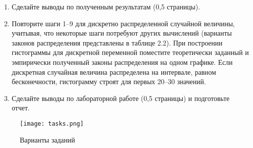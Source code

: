 \begin{enumerate}
    \item Сделайте выводы по полученным результатам (0,5 страницы).
    
    \item Повторите шаги 1–9 для дискретно распределенной случайной величины, учитывая, что некоторые шаги потребуют других вычислений (варианты законов распределения представлены в таблице 2.2). При построении гистограммы для дискретной переменной поместите теоретически заданный и эмпирически полученный законы распределения на одном графике. Если дискретная случайная величина распределена на интервале, равном бесконечности, гистограмму строят для первых 20–30 значений.
    
    \item Сделайте выводы по лабораторной работе (0,5 страницы) и подготовьте отчет.
\end{enumerate}

\begin{figure}[ht]
    \centering
    \texttt{[image: tasks.png]}
    \caption{Варианты заданий}
\end{figure}



\endinput
